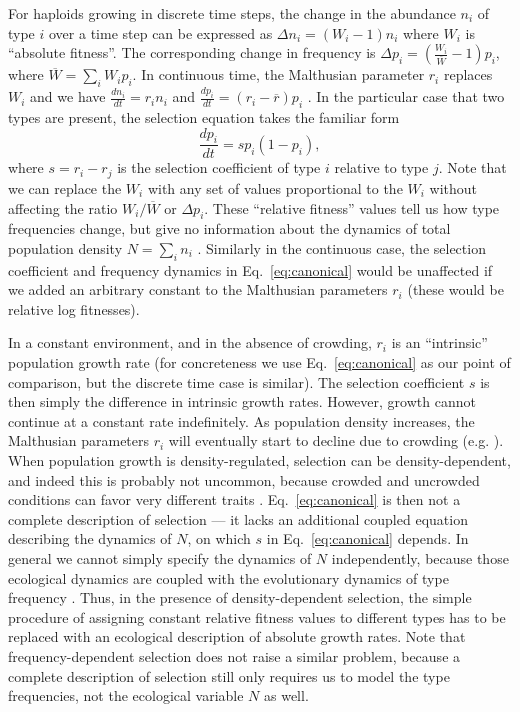 \documentclass[12pt]{article}
\begin{document}
For haploids growing in discrete time steps, the change in the abundance $n_i$ of type $i$ over a time step can be expressed as $\Delta n_i=(W_i - 1)n_i$ where $W_i$ is ``absolute fitness''. The corresponding change in frequency is $\Delta p_i=\left(\frac{W_i}{\overline{W}}-1\right) p_i$, where $\overline{W}=\sum_i W_i p_i$. In continuous time, the Malthusian parameter $r_i$ replaces $W_i$ and we have $\frac{d n_i}{dt}=r_in_i$ and $\frac{d p_i}{dt}=(r_i-\overline{r}) p_i$ \citep{crow_1970}. In the particular case that two types are present, the selection equation takes the familiar form
\begin{equation}
\frac{d p_i}{dt}=s p_i(1-p_i), \label{eq:canonical}
\end{equation}
where $s=r_i-r_j$ is the selection coefficient of type $i$ relative to type $j$. Note that we can replace the $W_i$ with any set of values proportional to the $W_i$ without affecting the  ratio $W_i/\overline{W}$ or $\Delta p_i$. These ``relative fitness'' values tell us how type frequencies change, but give no information about the dynamics of total population density $N=\sum_i n_i$ \citep[pp. 468]{barton_2007}. Similarly in the continuous case, the selection coefficient and frequency dynamics in Eq.~\eqref{eq:canonical} would be unaffected if we added an arbitrary constant to the Malthusian parameters $r_i$ (these would be relative log fitnesses).  

In a constant environment, and in the absence of crowding, $r_i$ is an ``intrinsic'' population growth rate (for concreteness we use Eq.~\eqref{eq:canonical} as our point of comparison, but the discrete time case is similar). The selection coefficient $s$ is then simply the difference in intrinsic growth rates. However, growth cannot continue at a constant rate indefinitely. As population density increases, the Malthusian parameters $r_i$ will eventually start to decline due to crowding (e.g. \citealt[pp. 203]{begon_1990}). When population growth is density-regulated, selection can be density-dependent, and indeed this is probably not uncommon, because crowded and uncrowded conditions can favor very different traits \citep{travis_2013}. Eq.~\eqref{eq:canonical} is then not a complete description of selection --- it lacks an additional coupled equation describing the dynamics of $N$, on which $s$ in Eq.~\eqref{eq:canonical} depends. In general we cannot simply specify the dynamics of $N$ independently, because those ecological dynamics are coupled with the evolutionary dynamics of type frequency \citep{travis_2013}. Thus, in the presence of density-dependent selection, the simple procedure of assigning constant relative fitness values to different types has to be replaced with an ecological description of absolute growth rates. Note that frequency-dependent selection does not raise a similar problem, because a complete description of selection still only requires us to model the type frequencies, not the ecological variable $N$ as well. 
\end{document}
